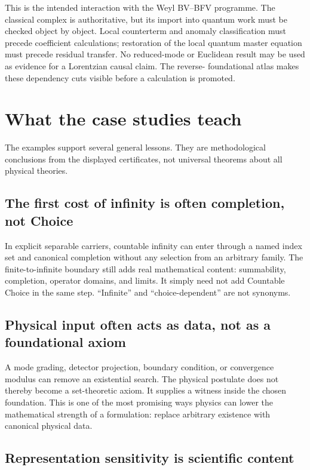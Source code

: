 \documentclass[11pt]{article}
\theoremstyle{definition}
\theoremstyle{remark}
\begin{document}
This is the intended interaction with the Weyl BV--BFV programme.  The
classical complex is authoritative, but its import into quantum work must be
checked object by object.  Local counterterm and anomaly classification must
precede coefficient calculations; restoration of the local quantum master
equation must precede residual transfer.  No reduced-mode or Euclidean result
may be used as evidence for a Lorentzian causal claim.  The reverse-
foundational atlas makes these dependency cuts visible before a calculation
is promoted.

\section{What the case studies teach}
\label{sec:lessons}

The examples support several general lessons.  They are methodological
conclusions from the displayed certificates, not universal theorems about all
physical theories.

\subsection{The first cost of infinity is often completion, not Choice}

In explicit separable carriers, countable infinity can enter through a named
index set and canonical completion without any selection from an arbitrary
family.  The finite-to-infinite boundary still adds real mathematical content:
summability, completion, operator domains, and limits.  It simply need not add
Countable Choice in the same step.  ``Infinite'' and ``choice-dependent'' are
not synonyms.

\subsection{Physical input often acts as data, not as a foundational axiom}

A mode grading, detector projection, boundary condition, or convergence
modulus can remove an existential search.  The physical postulate does not
thereby become a set-theoretic axiom.  It supplies a witness inside the chosen
foundation.  This is one of the most promising ways physics can lower the
mathematical strength of a formulation: replace arbitrary existence with
canonical physical data.

\subsection{Representation sensitivity is scientific content}
\end{document}
